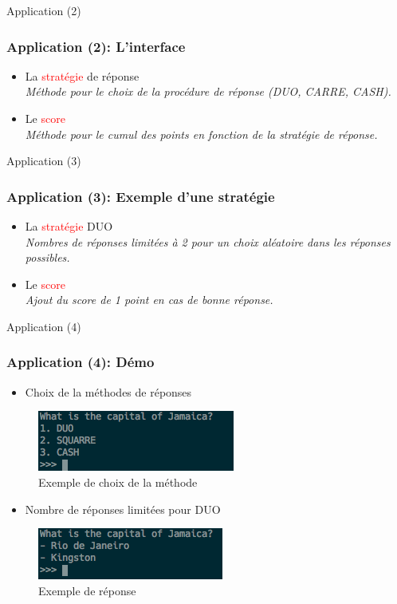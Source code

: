 \documentclass{beamer}
\begin{document}
  \begin{frame}{Application (2)}
    \frametitle{Application (2): L'interface}
    \begin{itemize}
      \item La \textcolor{red}{stratégie} de réponse \\
      \textit{Méthode pour le choix de la procédure de réponse (DUO, CARRE, CASH).}
        \item Le \textcolor{red}{score}  \\
      \textit{Méthode pour le cumul des points en fonction de la stratégie de réponse.}
    \end{itemize}
    
  \end{frame}

  \begin{frame}{Application (3)}
    \frametitle{Application (3): Exemple d'une stratégie}
    \begin{itemize}
      \item La \textcolor{red}{stratégie} DUO \\
      \textit{Nombres de réponses limitées à 2 pour un choix aléatoire dans les réponses possibles.}
        \item Le \textcolor{red}{score}  \\
      \textit{Ajout du score de 1 point en cas de bonne réponse.}
    \end{itemize}
    
  \end{frame}

  \begin{frame}{Application (4)}
    \frametitle{Application (4): Démo}
    \begin{itemize}
      \item Choix de la méthodes de réponses 
    \end{itemize}
    \begin{figure}[!b]
      \centering
      \includegraphics[scale=0.5]{choix}
      \caption{Exemple de choix de la méthode}
    \end{figure}
        \begin{itemize}
      \item Nombre de réponses limitées pour DUO
    \end{itemize}
    \begin{figure}[!b]
      \centering
      \includegraphics[scale=0.5]{reponse}
      \caption{Exemple de réponse}
    \end{figure}
  \end{frame}
\end{document}
